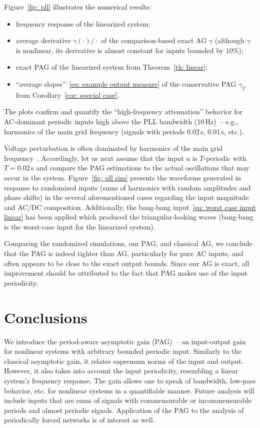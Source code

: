 \documentclass[letterpaper, 10 pt, conference]{ieeeconf}
\begin{document}
Figure~\ref{fig: pll} illustrates the numerical results:
\begin{itemize}
    \item frequency response of the linearized system;
    \item average derivative $\gamma(\cdot)/\cdot$ of the comparison-based exact AG $\gamma$ (although $\gamma$ is nonlinear, its derivative is almost constant for inputs bounded by $10\%$);
    \item exact PAG of the linearized system from Theorem~\ref{th: linear};
    \item ``average slopes''~\eqref{eq: example output measure} of the conservative PAG $\gamma_T$ from Corollary~\ref{cor: special case}.
\end{itemize}
The plots confirm and quantify the ``high-frequency attenuation'' behavior for AC-dominant periodic inputs high above the PLL bandwidth (10\,Hz)~-- e.g., harmonics of the main grid frequency (signals with periods 0.02\,s, 0.01\,s, etc.).

Voltage perturbation is often dominated by harmonics of the main grid frequency~\cite{erogluHarmonicProblemsRenewable2021}. Accordingly, let us next assume that the input $u$ is $T$-periodic with $T = 0.02$\,s and compare the PAG estimations to the actual oscillations that may occur in the system. Figure~\ref{fig: pll sim} presents the waveforms generated in response to randomized inputs (sums of harmonics with random amplitudes and phase shifts) in the several aforementioned cases regarding the input magnitude and AC/DC composition. Additionally, the bang-bang input~\eqref{eq: worst case input linear} has been applied which produced the triangular-looking waves (bang-bang is the worst-case input for the linearized system).

Comparing the randomized simulations, our PAG, and classical AG, we conclude that the PAG is indeed tighter than AG, particularly for pure AC inputs, and often appears to be close to the exact output bounds. Since our AG is exact, all improvement should be attributed to the fact that PAG makes use of the input periodicity.

\section{Conclusions}

We introduce the period-aware asymptotic gain (PAG)~-- an input-output gain for nonlinear systems with arbitrary bounded periodic input. Similarly to the classical asymptotic gain, it relates supremum norms of the input and output. However, it also takes into account the input periodicity, resembling a linear system's frequency response. The gain allows one to speak of bandwidth, low-pass behavior, etc. for nonlinear systems in a quantifiable manner. Future analysis will include inputs that are sums of signals with commensurable or incommensurable periods and almost periodic signals. Application of the PAG to the analysis of periodically forced networks is of interest as well.
\end{document}
